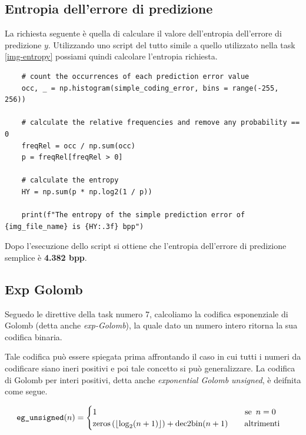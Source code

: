 \subsection{Entropia dell'errore di predizione}
La richiesta seguente è quella di calculare il valore dell'entropia dell'errore di predizione $y$. Utilizzando uno script del tutto simile a quello utilizzato nella task \ref{img-entropy} possiami quindi calcolare l'entropia richiesta.

\begin{lstlisting}
    # count the occurrences of each prediction error value
    occ, _ = np.histogram(simple_coding_error, bins = range(-255, 256))

    # calculate the relative frequencies and remove any probability == 0
    freqRel = occ / np.sum(occ)
    p = freqRel[freqRel > 0]

    # calculate the entropy
    HY = np.sum(p * np.log2(1 / p))
    
    print(f"The entropy of the simple prediction error of {img_file_name} is {HY:.3f} bpp")
\end{lstlisting}

\noindent Dopo l'esecuzione dello script si ottiene che l'entropia dell'errore di predizione semplice è \textbf{4.382 bpp}.



\subsection{Exp Golomb}\label{exp-golomb}
Seguedo le direttive della task numero 7, calcoliamo la codifica esponenziale di Golomb (detta anche \textsl{exp-Golomb}), la quale dato un numero intero ritorna la sua codifica binaria.

Tale codifica può essere spiegata prima affrontando il caso in cui tutti i numeri da codificare siano ineri positivi e poi tale concetto si può generalizzare. La codifica di Golomb per interi positivi, detta anche \textsl{exponential Golomb unsigned}, è deifnita come segue.

\begin{gather*}
    \text{\texttt{eg\_unsigned}}(n) =
    \begin{cases}
        1 \hspace{180px} \text{se } \, n = 0 \\
        \text{zeros}\left( \left\lfloor \log_2(n + 1) \right\rfloor \right) + \text{dec2bin}(n + 1) \hspace{20px} \text{altrimenti}
    \end{cases}
\end{gather*}

